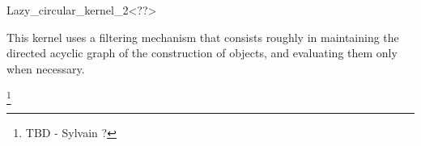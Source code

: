 \begin{ccRefClass}{Lazy_circular_kernel_2<??>}

\ccDefinition

This kernel uses a filtering mechanism that consists roughly in
maintaining the directed acyclic graph of the construction of objects,
and evaluating them only when necessary.


\ccIsModel


\ccParameters

\footnote{TBD - Sylvain ?}


\end{ccRefClass}
